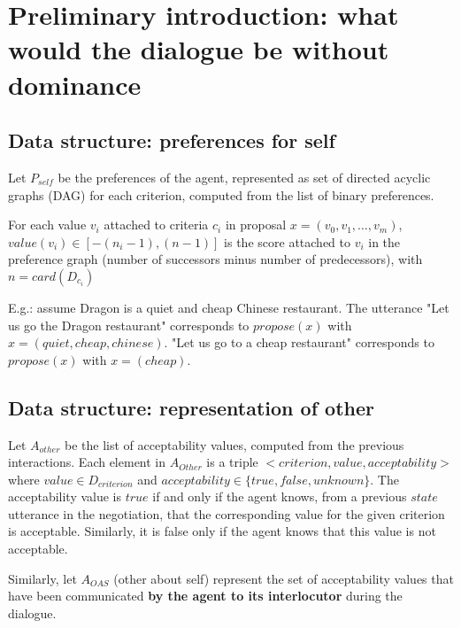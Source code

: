 \documentclass{article}
\begin{document}
	\title{\vskip -10pt}
	
	\author{Lydia Ould Ouali, Charles Rich \and
	Nicolas Sabouret }
	

	\begin{abstract}\vskip -20pt
	  
	\end{abstract}

\section{Preliminary introduction: what would the dialogue be without dominance}

\subsection{Data structure: preferences for self}
Let $P_{self}$ be the preferences of the agent, represented as set of directed acyclic graphs (DAG) for each criterion, computed from the list of binary preferences.

For each value $v_i$ attached to criteria $c_i$ in proposal $x=(v_0,v_1,\ldots,v_m)$, $value(v_i)\in[-(n_i-1),(n-1)]$ is the score attached to $v_i$ in the preference graph (number of successors minus number of predecessors), with $n=card(D_{c_i})$

E.g.: assume Dragon is a quiet and cheap Chinese restaurant. The utterance "Let us go the Dragon restaurant" corresponds to $propose(x)$ with $x=(quiet,cheap,chinese)$. "Let us go to a cheap restaurant" corresponds to $propose(x)$ with $x=(cheap)$.

\subsection{Data structure: representation of other}
Let $A_{other}$ be the list of acceptability values, computed from the previous interactions. Each element in $A_{Other}$ is a triple $<criterion,value,acceptability>$ where $value\in D_{criterion}$ and $acceptability\in\{true,false,unknown\}$. The acceptability value is $true$ if and only if the agent knows, from a previous $state$ utterance in the negotiation, that the corresponding value for the given criterion is acceptable. Similarly, it is false only if the agent knows that this value is not acceptable.

Similarly, let $A_{OAS}$ (other about self) represent the set of acceptability values that have been communicated \textbf{by the agent to its interlocutor} during the dialogue.
\end{document}
